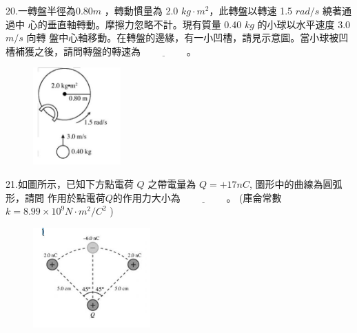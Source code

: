 \documentclass[cn,10pt,math=newtx,chinesefont=founder,device=ig]{elegantbook}
\begin{document}
\begin{example}
   20.一轉盤半徑為0.80$m$ ，轉動慣量為 2.0 $kg \cdot m^2$，此轉盤以轉速 1.5 $rad/s$ 繞著通過中
心的垂直軸轉動。摩擦力忽略不計。現有質量 0.40 $kg$ 的小球以水平速度 3.0 $m/s$ 向轉
盤中心軸移動。在轉盤的邊緣，有一小凹槽，請見示意圖。當小球被凹槽補獲之後，請問轉盤的轉速為$\underline{\hspace{2cm}}$。\\
    \rightline{[桃園聯招教甄109]}
\end{example}
\begin{solution}
    
\end{solution}
\begin{figure}[htbp]
    \flushright
    \includegraphics[width=0.3\textwidth]{image/109桃聯20.png}
  \end{figure}
\newpage


\begin{example}
   21.如圖所示，已知下方點電荷 $Q$ 之帶電量為 $Q = +17 nC$, 圖形中的曲線為圓弧形，請問 作用於點電荷$Q$的作用力大小為$\underline{\hspace{2cm}}$。 (庫侖常數 $k = 8.99 \times 10^9 N \cdot m^2/C^2$
)\\
    \rightline{[桃園聯招教甄109]}
\end{example}
\begin{solution}
    
\end{solution}
\begin{figure}[htbp]
    \flushright
    \includegraphics[width=0.4\textwidth]{image/109桃聯21.png}
  \end{figure}
\newpage
\end{document}
